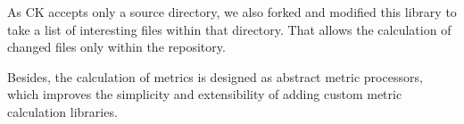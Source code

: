 As CK accepts only a source directory, we also forked and modified this library to take a list of interesting files within that directory. That allows the calculation of changed files only within the repository.

Besides, the calculation of metrics is designed as abstract metric processors, which improves the simplicity and extensibility of adding custom metric calculation libraries.